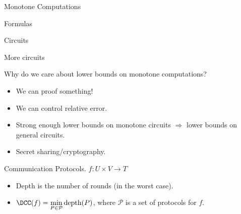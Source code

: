 \begin{frame}{Monotone Computations}

    \begin{minipage}{0.33\linewidth}
        \centering
        Formulas
        \vspace{0.2cm}
        
        
    \end{minipage}
    \begin{minipage}{0.33\linewidth}
        \centering
        Circuits
        \vspace{0.2cm}
        
        
    \end{minipage}
    \begin{minipage}{0.32\linewidth}
        \centering
        More circuits
        \vspace{0.2cm}
        
        
    \end{minipage}

    \pause
    Why do we care about lower bounds on monotone computations?
    \begin{itemize}
        \item We can proof something!
            \pause
        \item We can control relative error.
            \pause
        \item Strong enough lower bounds on monotone circuits $\Rightarrow$ lower bounds on general circuits.
            \pause
        \item Secret sharing/cryptography.
    \end{itemize}
\end{frame}


\begin{frame}{Communication Protocols. $f\colon U \times V \to T$}
    \begin{center}
    	    
    \end{center}

    \pause
    \pause
    \pause
	\pause

    \begin{itemize}
        \item Depth is the number of rounds (in the worst case).
        \item $\DCC(f) = \min\limits_{P \in \mathcal{P}} \mathrm{depth}(P)$, where $\mathcal{P}$ is a set
            of protocols for $f$.
    \end{itemize}
\end{frame}

